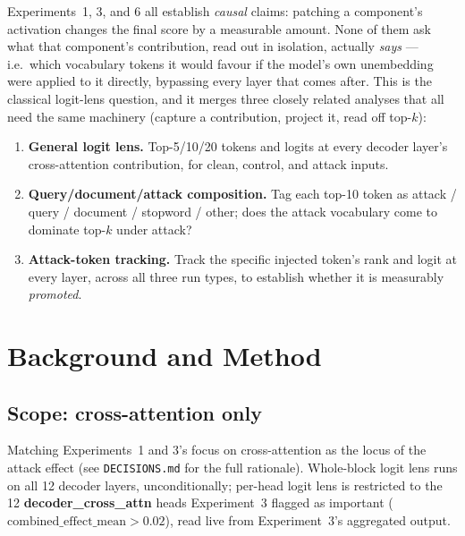 \documentclass[11pt]{article}
\begin{document}
Experiments~1, 3, and 6 all establish \emph{causal} claims: patching a
component's activation changes the final score by a measurable amount.
None of them ask what that component's contribution, read out in isolation,
actually \emph{says} — i.e.\ which vocabulary tokens it would favour if the
model's own unembedding were applied to it directly, bypassing every layer
that comes after. This is the classical logit-lens question, and it merges
three closely related analyses that all need the same machinery (capture a
contribution, project it, read off top-$k$):

\begin{enumerate}
  \item \textbf{General logit lens.} Top-5/10/20 tokens and logits at every
  decoder layer's cross-attention contribution, for clean, control, and
  attack inputs.
  \item \textbf{Query/document/attack composition.} Tag each top-10 token
  as attack / query / document / stopword / other; does the attack
  vocabulary come to dominate top-$k$ under attack?
  \item \textbf{Attack-token tracking.} Track the specific injected token's
  rank and logit at every layer, across all three run types, to establish
  whether it is measurably \emph{promoted}.
\end{enumerate}

\section{Background and Method}

\subsection{Scope: cross-attention only}

Matching Experiments~1 and 3's focus on cross-attention as the locus of the
attack effect (see \texttt{DECISIONS.md} for the full rationale). Whole-block
logit lens runs on all 12 decoder layers, unconditionally; per-head logit
lens is restricted to the 12 \textbf{decoder\_cross\_attn} heads Experiment~3
flagged as important ($\text{combined\_effect\_mean} > 0.02$), read live from
Experiment~3's aggregated output.
\end{document}

